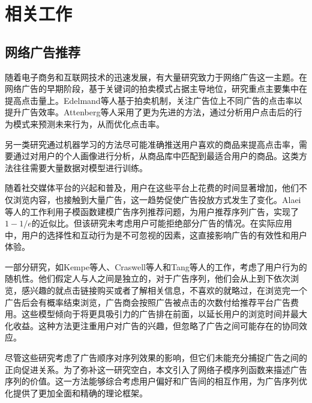 

\chapter{相关工作}

\section{网络广告推荐}
\label{sec:2_1}

随着电子商务和互联网技术的迅速发展，有大量研究致力于网络广告这一主题。在网络广告的早期阶段，基于关键词的拍卖模式占据主导地位，研究重点主要集中在提高点击量上。Edelmand等人\cite{edelman2007internet}基于拍卖机制，关注广告位上不同广告的点击率以提升广告效率。Attenberg等人\cite{attenberg2009modeling}采用了更为先进的方法，通过分析用户点击后的行为模式来预测未来行为，从而优化点击率。

另一类研究通过机器学习的方法尽可能准确推送用户喜欢的商品来提高点击率\cite{Cai2021,li2021effective}，需要通过对用户的个人画像进行分析，从商品库中匹配到最适合用户的商品。这类方法往往需要大量数据对模型进行训练。

随着社交媒体平台的兴起和普及，用户在这些平台上花费的时间显著增加，他们不仅浏览内容，也接触到大量广告，这一趋势促使广告投放方式发生了变化。Alaei等人\cite{alaei2021maximizing}的工作利用子模函数建模广告序列推荐问题，为用户推荐序列广告，实现了$1-1/e$的近似比。但该研究未考虑用户可能拒绝部分广告的情况。在实际应用中，用户的选择性和互动行为是不可忽视的因素，这直接影响广告的有效性和用户体验。

一部分研究，如Kempe等人\cite{kempe2008cascade}、Craswell等人\cite{craswell2008experimental}和Tang等人\cite{tang2017robust}的工作，考虑了用户行为的随机性。他们假定人与人之间是独立的，对于广告序列，他们会从上到下依次浏览，感兴趣的就点击链接购买或者了解相关信息，不喜欢的就略过，在浏览完一个广告后会有概率结束浏览，广告商会按照广告被点击的次数付给推荐平台广告费用。这些模型倾向于将更具吸引力的广告排在前面，以延长用户的浏览时间并最大化收益。这种方法更注重用户对广告的兴趣，但忽略了广告之间可能存在的协同效应。

尽管这些研究考虑了广告顺序对序列效果的影响，但它们未能充分捕捉广告之间的正向促进关系。为了弥补这一研究空白，本文引入了网络子模序列函数来描述广告序列的价值。这一方法能够综合考虑用户偏好和广告间的相互作用，为广告序列优化提供了更加全面和精确的理论框架。

